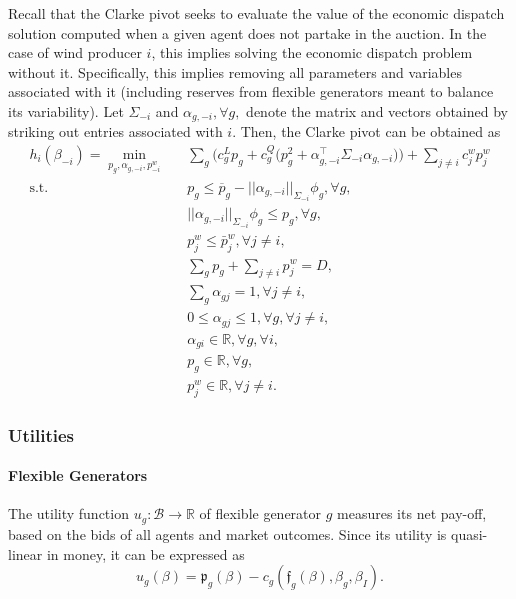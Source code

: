 \documentclass{article}
\begin{document}
Recall that the Clarke pivot seeks to evaluate the value of the economic dispatch solution computed when a given agent does not partake in the auction. In the case of wind producer $i$, this implies solving the economic dispatch problem without it. Specifically, this implies removing all parameters and variables associated with it (including reserves from flexible generators meant to balance its variability). Let $\Sigma_{-i}$ and $\alpha_{g, -i}, \forall g,$ denote the matrix and vectors obtained by striking out entries associated with $i$. Then, the Clarke pivot can be obtained as
\begin{align*}
h_i(\beta_{-i}) = \underset{p_g, \alpha_{g,-i}, p_{-i}^w}{\min} \hspace{10pt} & \sum_g \Big(c_g^L p_g + c_g^Q \big(p_g^2 + \alpha_{g,-i}^\top \Sigma_{-i} \alpha_{g,-i}\big)\Big) + \sum_{j \ne i} c_j^w p_j^w \\
\mbox{s.t. } & p_g \le \overline{p}_g - ||\alpha_{g,-i}||_{\Sigma_{-i}} \phi_g,\forall g,\\
& ||\alpha_{g,-i}||_{\Sigma_{-i}} \phi_g \le p_g,\forall g,\\
& p_j^w \le \bar{p}_j^w, \forall j \ne i,\\
& \sum_g p_g + \sum_{j \ne i} p_j^w = D,\\
& \sum_g \alpha_{gj} = 1, \forall j \ne i,\\
& 0 \le \alpha_{gj} \le 1, \forall g, \forall j \ne i,\\
& \alpha_{gi} \in \mathbb{R}, \forall g, \forall i,\\
& p_g \in \mathbb{R}, \forall g,\\
& p_j^w \in \mathbb{R}, \forall j \ne i.
\end{align*}

\subsubsection{Utilities}

\paragraph{Flexible Generators} The utility function $u_g: \mathcal{B} \rightarrow \mathbb{R}$ of flexible generator $g$ measures its net pay-off, based on the bids of all agents and market outcomes. Since its utility is quasi-linear in money, it can be expressed as
\begin{equation*}
u_g(\beta) = \mathfrak{p}_g(\beta) - c_g(\mathfrak{f}_g(\beta), \beta_g, \beta_I).
\end{equation*}
\end{document}
